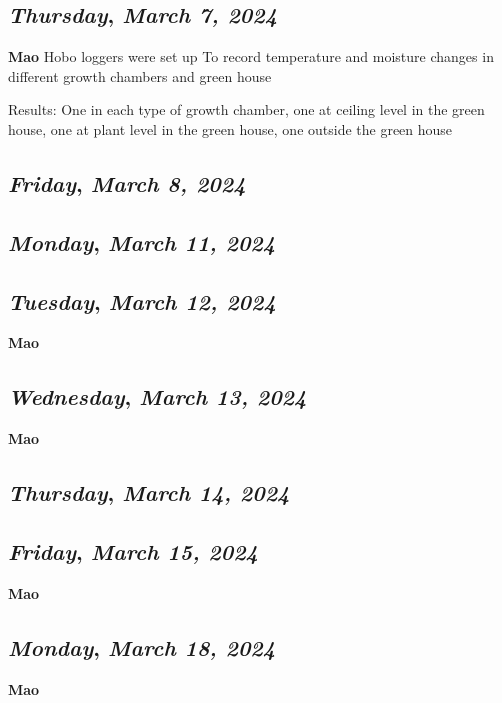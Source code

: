 \def\day{\textit{March 7, 2024}}
\def\weekday{\textit{Thursday}}
\subsection*{\weekday, \day}
\textbf {Mao}
Hobo loggers were set up To record temperature and moisture changes in different growth chambers and green house
\par Results: One in each type of growth chamber, one at ceiling level in the green house, one at plant level in the green house, one outside the green house
\def\day{\textit{March 8, 2024}}
\def\weekday{\textit{Friday}}
\subsection*{\weekday, \day}

\def\day{\textit{March 11, 2024}}
\def\weekday{\textit{Monday}}
\subsection*{\weekday, \day}

\def\day{\textit{March 12, 2024}}
\def\weekday{\textit{Tuesday}}
\subsection*{\weekday, \day}
\textbf {Mao}

\def\day{\textit{March 13, 2024}}
\def\weekday{\textit{Wednesday}}
\subsection*{\weekday, \day}
\textbf {Mao}

\def\day{\textit{March 14, 2024}}
\def\weekday{\textit{Thursday}}
\subsection*{\weekday, \day}

\def\day{\textit{March 15, 2024}}
\def\weekday{\textit{Friday}}
\subsection*{\weekday, \day}
\textbf {Mao}

\def\day{\textit{March 18, 2024}}
\def\weekday{\textit{Monday}}
\subsection*{\weekday, \day}
\textbf {Mao}

